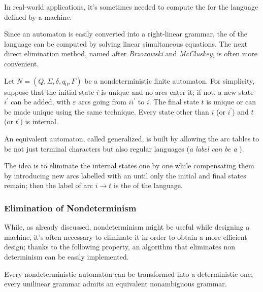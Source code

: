 \documentclass[english]{article}
\begin{document}
In real-world applications, it's sometimes needed to compute the \re for the language defined by a machine.

Since an automaton is easily converted into a right-linear grammar, the \re of the language can be computed by solving linear simultaneous equations.
The next direct elimination method, named \BMC after \textit{Brzozowski} and \textit{McCluskey}, is often more convenient.

\begin{definition}
  \label{def:brzozowski-mccluskey-algorithm}
  Let \(N = \left( Q, \Sigma, \delta, q_0, F \right)\) be a nondeterministic finite automaton.
  For simplicity, suppose that the initial state \(i\) is unique and no arcs enter it;
  if not, a new state \(i^\prime\) can be added, with \(\varepsilon\) arcs going from \(ii^\prime\) to \(i\).
  The final state \(t\) is unique or can be made unique using the same technique.
  Every state other than \(i\) (or \(i^\prime\)) and \(t\) (or \(t^\prime\)) is internal.

  An equivalent automaton, called generalized, is built by allowing the arc tables to be not just terminal characters but also regular languages (\textit{a label can be a \re}).

  The idea is to eliminate the internal states one by one while compensating them by introducing new arcs labelled with an \re until only the initial and final states remain;
  then the label of arc \(i \rightarrow t\) is the \re of the language.
\end{definition}

\subsubsection{Elimination of Nondeterminism}
\label{sec:elimination-of-nondeterminism}

While, as already discussed, nondeterminism might be useful while designing a machine, it's often necessary to eliminate it in order to obtain a more efficient design;
thanks to the following property, an algorithm that eliminates non determinism can be easily implemented.

\begin{property}
  Every nondeterministic automaton can be transformed into a deterministic one;
  every unilinear grammar admits an equivalent nonambiguous grammar.
\end{property}
\end{document}
